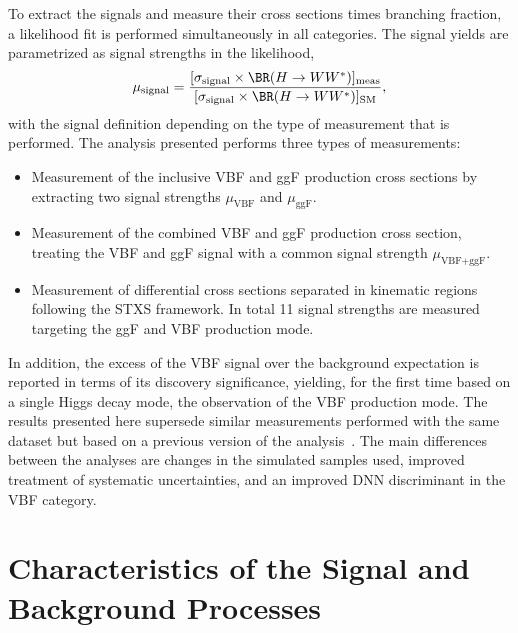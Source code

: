 To extract the signals and measure their cross sections times \HWW branching fraction, a likelihood fit is performed simultaneously in all categories. 
The signal yields are parametrized as signal strengths in the likelihood, 
\begin{equation}
    \label{eq:incl-ggF-VBF-signal-strengths}
    \mu_{\text{signal}} = \frac{ [ \sigma_{\text{signal}}  \times \BR(H \to WW^*) ]_\text{meas} } { [ \sigma_{\text{signal}} \times \BR(H \to WW^*) ]_\text{SM}}, 
\end{equation}
with the signal definition depending on the type of measurement that is performed.
The analysis presented performs three types of measurements:
\begin{itemize}
    \item Measurement of the inclusive VBF and ggF production cross sections by extracting two signal strengths $\mu_{\text{VBF}}$ and $\mu_{\text{ggF}}$.
    \item Measurement of the combined VBF and ggF production cross section, treating the VBF and ggF signal with a common signal strength $\mu_{\text{VBF+ggF}}$. 
    \item Measurement of differential cross sections separated in kinematic regions following the STXS framework. In total 11 signal strengths are measured targeting the ggF and VBF production mode. 
\end{itemize}
In addition, the excess of the VBF signal over the background expectation is reported in terms of its discovery significance, yielding, for the first time based on a single Higgs decay mode, the observation of the VBF production mode.
The results presented here supersede similar measurements performed with the same dataset but based on a previous version of the analysis~\cite{ATLAS-CONF-2021-014}.
The main differences between the analyses are changes in the simulated samples used, improved treatment of systematic uncertainties, and an improved DNN discriminant in the VBF category. 

% 

\section{Characteristics of the Signal and Background Processes}
\label{sec:signal-bkg-characteristics}



